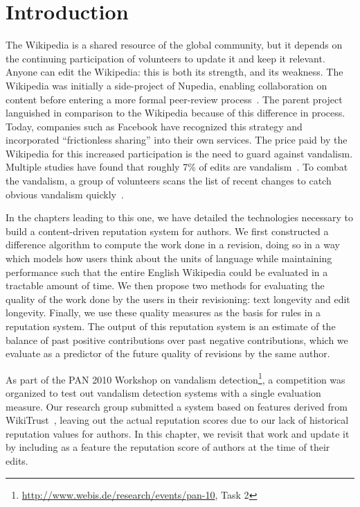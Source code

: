 \section{Introduction}

The Wikipedia is a shared resource of the global community, but it depends on
the continuing participation of volunteers to update it and keep it relevant.
Anyone can edit the Wikipedia: this is both its strength, and its weakness.
The Wikipedia was initially a side-project of Nupedia, enabling collaboration on content
before entering a more formal peer-review process~\cite{wiki:Nupedia}.
The parent project languished in comparison to the Wikipedia because of
this difference in process.  Today, companies such as Facebook have
recognized this strategy and incorporated ``frictionless sharing'' into
their own services.
The price paid by the Wikipedia for this increased participation is the
need to guard against vandalism.
Multiple studies have found that roughly 7\% of edits are
vandalism~\cite{Potthast2008,Potthast2010a}.
To combat the vandalism, a group of volunteers scans the list of recent changes
to catch obvious vandalism quickly~\cite{wiki:RCPatrol}.

In the chapters leading to this one, we have detailed the technologies
necessary to build a content-driven reputation system for authors.
We first constructed a difference algorithm to compute the work done in a
revision, doing so in a way which models how users think about the units of
language while maintaining performance such that the entire English Wikipedia
could be evaluated in a tractable amount of time.
We then propose two methods for evaluating the quality of the work done by the
users in their revisioning: text longevity and edit longevity.
Finally, we use these quality measures as the basis for rules in a reputation
system.
The output of this reputation system is an estimate of the balance of past
positive contributions over past negative contributions, which we evaluate
as a predictor of the future quality of revisions by the same author.

As part of the PAN 2010 Workshop on vandalism
detection\footnote{\url{http://www.webis.de/research/events/pan-10}, Task 2},
a competition was organized to test out vandalism detection systems with a
single evaluation measure.
Our research group submitted a system based on features derived from
WikiTrust~\cite{Adler2010b}, leaving out the actual reputation scores due
to our lack of historical reputation values for authors.
In this chapter, we revisit that work and update it by including as a feature
the reputation score of authors at the time of their edits.

